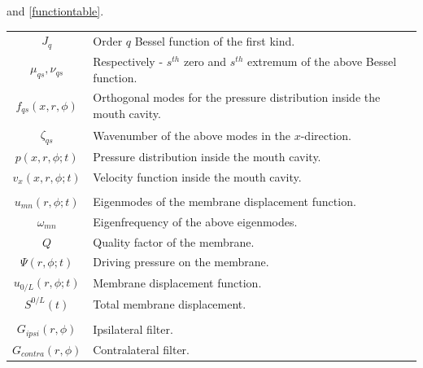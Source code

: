 and \ref{functiontable}.
\begin{minipage}{\linewidth}
\renewcommand{\arraystretch}{1.1}
\centering
{} \label{functiontable} 
\begin{tabular}{c p{13 cm}}
\hline
$J_q$ & Order $q$ Bessel function of the first kind.\\
$\mu_{qs},\nu_{qs}$ & Respectively - $s^{th}$ zero and $s^{th}$ extremum of the above Bessel function.\\
$f_{qs}(x,r,\phi)$ & Orthogonal modes for the pressure distribution inside the mouth cavity.\\
$\zeta_{qs}$ & Wavenumber of the above modes in the $x$-direction.\\
$p(x,r,\phi;t)$ & Pressure distribution inside the mouth cavity.\\
$v_x(x,r,\phi;t)$ & Velocity function inside the mouth cavity.\\
&\\
$u_{mn}(r,\phi;t)$ & Eigenmodes of the membrane displacement function.\\
$\omega_{mn}$ & Eigenfrequency of the above eigenmodes.\\
$Q$ & Quality factor of the membrane.\\
$\Psi(r,\phi;t)$ & Driving pressure on the membrane.\\
$u_{0/L}(r,\phi;t)$ & Membrane displacement function.\\
$S^{0/L}(t)$ & Total membrane displacement.\\
&\\
$G_{ipsi}(r,\phi)$ & Ipsilateral filter.\\
$G_{contra}(r,\phi)$ & Contralateral filter.\\
\hline
\end {tabular}\par
\bigskip
\end{minipage}
